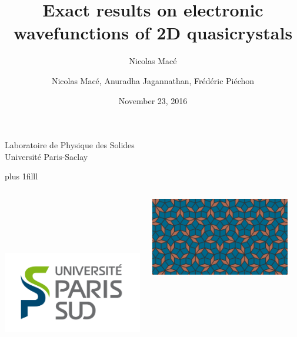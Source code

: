 \documentclass[xcolor=x11names,compress,professionalfonts, aspectratio=169]{beamer}
\author{Nicolas Macé}
\newcommand{\btVFill}{\vskip0pt plus 1filll}%
\renewcommand{\(}{\begin{columns}}
\renewcommand{\)}{\end{columns}}
\newcommand{\<}[1]{\begin{column}{#1}}
\renewcommand{\>}{\end{column}}
\begin{document}
\begin{frame}
\title{{\fontsize{14}{60}\selectfont Exact results on electronic wavefunctions of 2D quasicrystals}}

\author{Nicolas Macé, Anuradha Jagannathan, Frédéric Piéchon}

\institute %
{
  Laboratoire de Physique des Solides\\
  Université Paris-Saclay
}

\date{November 23, 2016}

\titlepage

\btVFill
\begin{columns}
\begin{column}{2cm}
~\\
~\\
~\\
~\\
\raggedright
\includegraphics[scale=.15]{img/LogoUPSUD.png}
\end{column}
\begin{column}{6cm}
\centering
\includegraphics[width=.8\textwidth]{img/cover.png}
\end{column}
\begin{column}{2cm}
~\\

\end{column}
\end{columns}
\end{frame}
\end{document}
